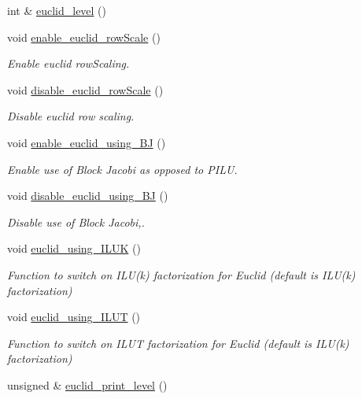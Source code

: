 \begin{DoxyCompactItemize}
int \& \hyperlink{classoomph_1_1HypreSolver_a0cd0d27a90c05a6626f13c6255b6e6d1}{euclid\+\_\+level} ()
\item 
void \hyperlink{classoomph_1_1HypreSolver_a8a96671322af214937d924546633648f}{enable\+\_\+euclid\+\_\+row\+Scale} ()
\begin{DoxyCompactList}\small\item\em Enable euclid row\+Scaling. \end{DoxyCompactList}\item 
void \hyperlink{classoomph_1_1HypreSolver_a0cedd83299949fcc877c060e6dd7639f}{disable\+\_\+euclid\+\_\+row\+Scale} ()
\begin{DoxyCompactList}\small\item\em Disable euclid row scaling. \end{DoxyCompactList}\item 
void \hyperlink{classoomph_1_1HypreSolver_a1d9e7f9f4419b3a2fc12c3cdffb603d0}{enable\+\_\+euclid\+\_\+using\+\_\+\+BJ} ()
\begin{DoxyCompactList}\small\item\em Enable use of Block Jacobi as opposed to P\+I\+LU. \end{DoxyCompactList}\item 
void \hyperlink{classoomph_1_1HypreSolver_a07def5b52e105be6f19a40f43e41548e}{disable\+\_\+euclid\+\_\+using\+\_\+\+BJ} ()
\begin{DoxyCompactList}\small\item\em Disable use of Block Jacobi,. \end{DoxyCompactList}\item 
void \hyperlink{classoomph_1_1HypreSolver_ad0206b4977a0e7aa78a386a8803ffcd4}{euclid\+\_\+using\+\_\+\+I\+L\+UK} ()
\begin{DoxyCompactList}\small\item\em Function to switch on I\+L\+U(k) factorization for Euclid (default is I\+L\+U(k) factorization) \end{DoxyCompactList}\item 
void \hyperlink{classoomph_1_1HypreSolver_a831cd8c7324a117e2949ee734adf95cd}{euclid\+\_\+using\+\_\+\+I\+L\+UT} ()
\begin{DoxyCompactList}\small\item\em Function to switch on I\+L\+UT factorization for Euclid (default is I\+L\+U(k) factorization) \end{DoxyCompactList}\item 
unsigned \& \hyperlink{classoomph_1_1HypreSolver_a367077503c12f1d5b6b57759cb3ed872}{euclid\+\_\+print\+\_\+level} ()

\end{DoxyCompactItemize}
